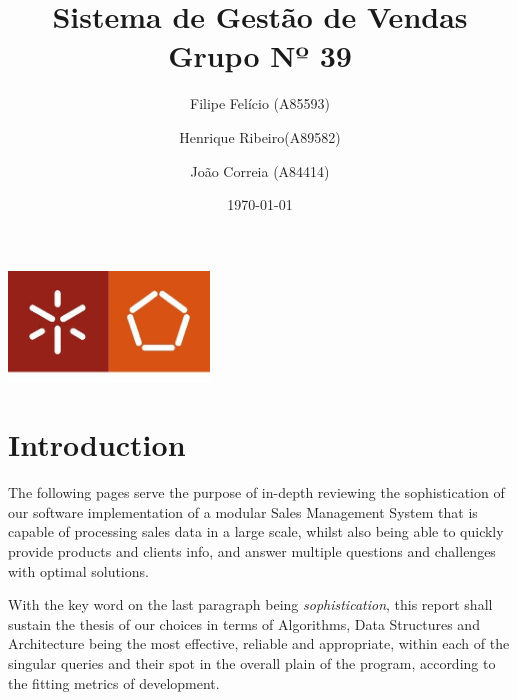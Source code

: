 \documentclass[a4paper]{report}
\begin{document}
\title{Sistema de Gestão de Vendas\\ 
\large Grupo Nº 39}
\author{Filipe Felício (A85593) \and Henrique Ribeiro(A89582) \and João Correia (A84414)}
\date{\today}

\begin{center}
    \begin{minipage}{0.75\linewidth}
        \centering
        \includegraphics[width=0.4\textwidth]{eng.jpeg}\par\vspace{1cm}
        \vspace{1.5cm}
        \href{https://www.uminho.pt/PT}
        {\color{black}{\scshape\LARGE Universidade do Minho}} \par
        \vspace{1cm}
        \href{https://www.di.uminho.pt/}
        {\color{black}{\scshape\Large Departamento de Informática}} \par
        \vspace{1.5cm}
        \maketitle
    \end{minipage}
\end{center}

\tableofcontents

\pagebreak

\chapter{Introduction}



The following pages serve the purpose of in-depth reviewing the sophistication of our software implementation
of a modular Sales Management System that is capable of processing sales data in a large scale, 
whilst also being able to quickly provide products and clients info, and answer
multiple questions and challenges with optimal solutions.

With the key word on the last paragraph being \textit{sophistication}, this report shall sustain the thesis 
of our choices in terms of Algorithms, Data Structures and Architecture being the most effective, reliable 
and appropriate, within each of the singular queries and their spot in the overall plain of the program, 
according to the fitting metrics of development. 
\end{document}
